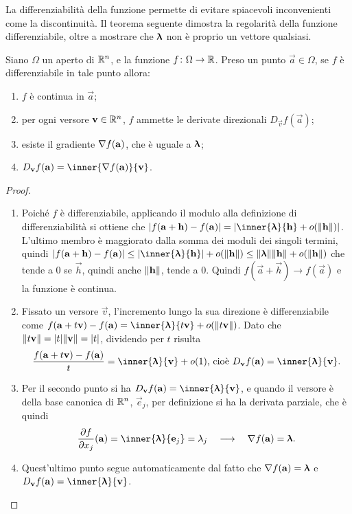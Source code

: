 La differenziabilità della funzione permette di evitare spiacevoli inconvenienti come la discontinuità. Il teorema seguente dimostra la regolarità della funzione differenziabile, oltre a mostrare che $\bm{\uplambda}$ non è proprio un vettore qualsiasi.
\begin{teorema} \label{t:conseguenze_differenziabilita}
Siano $\Omega$ un aperto di $\mathbb{R}^n$, e la funzione $f\colon\Omega\to\mathbb{R}$. Preso un punto $\vec a\in\Omega$, se $f$ è differenziabile in tale punto allora:
\begin{enumerate}
\item $f$ è continua in $\vec a$;
\item per ogni versore $\mathbf{v}\in\mathbb{R}^n$, $f$ ammette le derivate direzionali $D_{\vec v}f(\vec a)$;
\item esiste il gradiente $\nabla f(\mathbf{a})$, che è uguale a $\bm{\uplambda}$;
\item $D_{\vec v}f(\vec a)=\inner{\grad f(\vec a)}{\vec v}$.
\end{enumerate}
\end{teorema}
\begin{proof}
\begin{enumerate}
\item Poiché $f$ è differenziabile, applicando il modulo alla definizione di differenziabilità si ottiene che $\abs{f(\vec a+\vec h)-f(\vec a)}=\abs{\inner{\vlambda}{\vec h}+o(\norm{\vec h})}$. L'ultimo membro è maggiorato dalla somma dei moduli dei singoli termini, quindi $\abs{f(\vec a+\vec h)-f(\vec a)}\leq\abs{\inner{\vlambda}{\vec h}}+o(\norm{\vec h})\leq\norm{\vlambda}\norm{\vec h}+o(\norm{\vec h})$ che tende a 0 se $\vec h$, quindi anche $\lVert\mathbf{h}\rVert$, tende a 0. Quindi $f(\vec a+\vec h)\to f(\vec a)$ e la funzione è continua.
\item Fissato un versore $\vec v$, l'incremento lungo la sua direzione è differenziabile come $f(\vec a+t\vec v)-f(\vec a)=\inner{\vlambda}{t\vec v}+o(\norm{t\vec v})$. Dato che $\lVert t\mathbf{v}\rVert=\lvert t\rvert\lVert\mathbf{v}\rVert=\lvert t\rvert$, dividendo per $t$ risulta
\[
\frac{f(\vec a+t\vec v)-f(\vec a)}{t}=\inner{\vlambda}{\vec v}+o(1)\text{, cioè }D_{\vec v}f(\vec a)=\inner{\vlambda}{\vec v}.
\]
\item Per il secondo punto si ha $D_{\vec v}f(\vec a)=\inner{\vlambda}{\vec v}$, e quando il versore è della base canonica di $\mathbb{R}^n$, $\vec e_j$, per definizione si ha la derivata parziale, che è quindi
\[
\drp{f}{x_j}(\vec a)=\inner{\vlambda}{\vec e_j}=\lambda_j\qqq\grad f(\vec a)=\vlambda.
\]
\item Quest'ultimo punto segue automaticamente dal fatto che $\nabla f(\mathbf{a})=\bm{\uplambda}$ e $D_{\vec v}f(\vec a)=\inner{\vlambda}{\vec v}$.\qedhere
\end{enumerate}
\end{proof}

